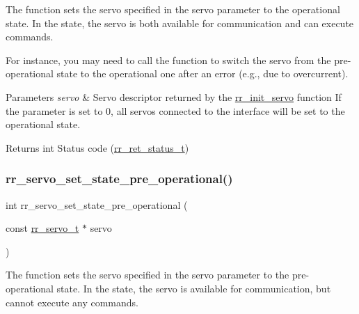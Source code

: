 The function sets the servo specified in the \textquotesingle{}servo\textquotesingle{} parameter to the operational state. In the state, the servo is both available for communication and can execute commands. 

For instance, you may need to call the function to switch the servo from the pre-\/operational state to the operational one after an error (e.\+g., due to overcurrent).


\begin{DoxyParams}{Parameters}
{\em servo} & Servo descriptor returned by the \hyperlink{group___init_ga0adb313a3eeb8a4399431e940a1f3e9e}{rr\+\_\+init\+\_\+servo} function If the parameter is set to 0, all servos connected to the interface will be set to the operational state. \\
\hline
\end{DoxyParams}
\begin{DoxyReturn}{Returns}
int Status code (\hyperlink{api_8h_a92d5be5038abcf89837faf85a08debdc}{rr\+\_\+ret\+\_\+status\+\_\+t}) 
\end{DoxyReturn}
\mbox{\label{group___state_ga39559219bfb36d4d9359365ac3656a74}} 
\subsubsection{\texorpdfstring{rr\+\_\+servo\+\_\+set\+\_\+state\+\_\+pre\+\_\+operational()}{rr\_servo\_set\_state\_pre\_operational()}}
{\footnotesize\ttfamily int rr\+\_\+servo\+\_\+set\+\_\+state\+\_\+pre\+\_\+operational (\begin{DoxyParamCaption}\item[{const \hyperlink{structrr__servo__t}{rr\+\_\+servo\+\_\+t} $\ast$}]{servo }\end{DoxyParamCaption})}



The function sets the servo specified in the \textquotesingle{}servo\textquotesingle{} parameter to the pre-\/operational state. In the state, the servo is available for communication, but cannot execute any commands. 

